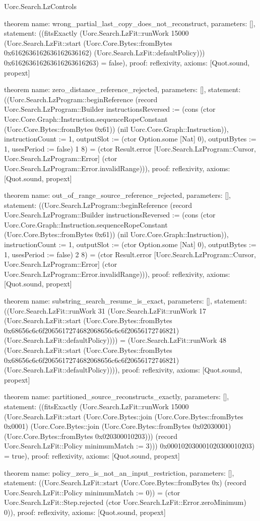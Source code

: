 \begin{lexlean}{Uorc.Search.LzControls}
\begin{semanticmodule}
theorem{
  name: wrong_partial_last_copy_does_not_reconstruct,
  parameters: [],
  statement: ((fitsExactly (Uorc.Search.LzFit::runWork 15000 (Uorc.Search.LzFit::start (Uorc.Core.Bytes::fromBytes 0x6162636162636162636162) (Uorc.Search.LzFit::defaultPolicy))) 0x616263616263616263616263) = false),
  proof: reflexivity{},
  axioms: [Quot.sound, propext]
}

theorem{
  name: zero_distance_reference_rejected,
  parameters: [],
  statement: ((Uorc.Search.LzProgram::beginReference (record Uorc.Search.LzProgram::Builder {instructionsReversed := (cons (ctor Uorc.Core.Graph::Instruction.sequenceRopeConstant (Uorc.Core.Bytes::fromBytes 0x61)) (nil Uorc.Core.Graph::Instruction)), instructionCount := 1, outputSlot := (ctor Option.some [Nat] 0), outputBytes := 1, usesPeriod := false}) 1 8) = (ctor Result.error [Uorc.Search.LzProgram::Cursor, Uorc.Search.LzProgram::Error] (ctor Uorc.Search.LzProgram::Error.invalidRange))),
  proof: reflexivity{},
  axioms: [Quot.sound, propext]
}

theorem{
  name: out_of_range_source_reference_rejected,
  parameters: [],
  statement: ((Uorc.Search.LzProgram::beginReference (record Uorc.Search.LzProgram::Builder {instructionsReversed := (cons (ctor Uorc.Core.Graph::Instruction.sequenceRopeConstant (Uorc.Core.Bytes::fromBytes 0x61)) (nil Uorc.Core.Graph::Instruction)), instructionCount := 1, outputSlot := (ctor Option.some [Nat] 0), outputBytes := 1, usesPeriod := false}) 2 8) = (ctor Result.error [Uorc.Search.LzProgram::Cursor, Uorc.Search.LzProgram::Error] (ctor Uorc.Search.LzProgram::Error.invalidRange))),
  proof: reflexivity{},
  axioms: [Quot.sound, propext]
}

theorem{
  name: substring_search_resume_is_exact,
  parameters: [],
  statement: ((Uorc.Search.LzFit::runWork 31 (Uorc.Search.LzFit::runWork 17 (Uorc.Search.LzFit::start (Uorc.Core.Bytes::fromBytes 0x68656c6c6f2065617274682068656c6c6f20656172746821) (Uorc.Search.LzFit::defaultPolicy)))) = (Uorc.Search.LzFit::runWork 48 (Uorc.Search.LzFit::start (Uorc.Core.Bytes::fromBytes 0x68656c6c6f2065617274682068656c6c6f20656172746821) (Uorc.Search.LzFit::defaultPolicy)))),
  proof: reflexivity{},
  axioms: [Quot.sound, propext]
}

theorem{
  name: partitioned_source_reconstructs_exactly,
  parameters: [],
  statement: ((fitsExactly (Uorc.Search.LzFit::runWork 15000 (Uorc.Search.LzFit::start (Uorc.Core.Bytes::join (Uorc.Core.Bytes::fromBytes 0x0001) (Uorc.Core.Bytes::join (Uorc.Core.Bytes::fromBytes 0x02030001) (Uorc.Core.Bytes::fromBytes 0x020300010203))) (record Uorc.Search.LzFit::Policy {minimumMatch := 3}))) 0x000102030001020300010203) = true),
  proof: reflexivity{},
  axioms: [Quot.sound, propext]
}

theorem{
  name: policy_zero_is_not_an_input_restriction,
  parameters: [],
  statement: ((Uorc.Search.LzFit::start (Uorc.Core.Bytes::fromBytes 0x) (record Uorc.Search.LzFit::Policy {minimumMatch := 0})) = (ctor Uorc.Search.LzFit::Step.rejected (ctor Uorc.Search.LzFit::Error.zeroMinimum) 0)),
  proof: reflexivity{},
  axioms: [Quot.sound, propext]
}
\end{semanticmodule}
\end{lexlean}
